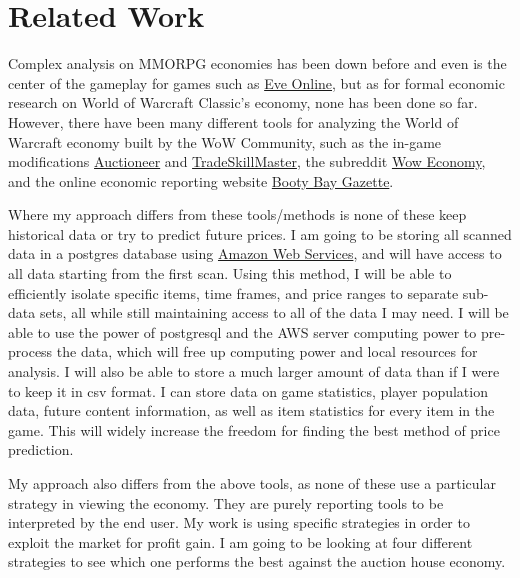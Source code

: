 \documentclass[sigconf]{acmart}
\begin{document}
\section{Related Work}
	Complex analysis on MMORPG economies has been down before and even is the center of the gameplay for games such as \href{https://www.eveonline.com/article/prg4uv/monthly-economic-report-april-2019}{Eve Online}, but as for formal economic research on World of Warcraft Classic’s economy, none has been done so far. However, there have been many different tools for analyzing the World of Warcraft economy built by the WoW Community, such as the in-game modifications \href{https://www.curseforge.com/wow/addons/auctioneer}{Auctioneer} and \href{https://www.tradeskillmaster.com/}{TradeSkillMaster}, the subreddit \href{https://www.reddit.com/r/woweconomy/}{Wow Economy}, and the online economic reporting website \href{https://www.reddit.com/r/woweconomy/}{Booty Bay Gazette}.

Where my approach differs from these tools/methods is none of these keep historical data or try to predict future prices. I am going to be storing all scanned data in a postgres database using \href{http://aws.amazon.com/}{Amazon Web Services}, and will have access to all data starting from the first scan. Using this method, I will be able to efficiently isolate specific items, time frames, and price ranges to separate sub-data sets, all while still maintaining access to all of the data I may need. I  will be able to use the power of postgresql and the AWS server computing power to pre-process the data, which will free up computing power and local resources for analysis. I will also be able to store a much larger amount of data than if I were to keep it in csv format. I can store data on game statistics, player population data, future content information, as well as item statistics for every item in the game. This will widely increase the freedom for finding the best method of price prediction.

My approach also differs from the above tools, as none of these use a particular strategy in viewing the economy. They are purely reporting tools to be interpreted by the end user. My work is using specific strategies in order to exploit the market for profit gain. I am going to be looking at four different strategies to see which one performs the best against the auction house economy.
\end{document}
